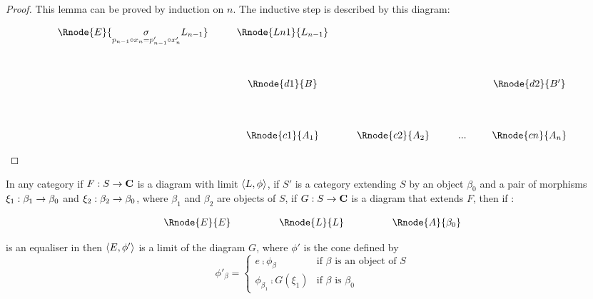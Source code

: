 \documentclass[10pt,a4paper]{scrartcl}
\begin{document}
\begin{proof}
\noindent This lemma can be proved by induction on $n$. 
The inductive step is described by this diagram:

\begin{center}
\begin{displaymath}
\begin{array}{cp{0.3cm}cp{0.3cm}c         p{0.3cm}  c p{0.2cm} c}
\Rnode{E}{\underset{p_{n-1} \comp x_n=p'_{n-1} \comp x'_n}{\sigma}L_{n-1}}&&\Rnode{Ln1}{L_{n-1}}& &               & &     & &                \\ [1.4cm]
&&\Rnode{d1}{B}& &               & &     & &\Rnode{d2}{B'}  \\ [1.4cm]
&&\Rnode{c1}{A_1}& &\Rnode{c2}{A_2}& & ... & &\Rnode{cn}{A_n}
\end{array}
\end{displaymath}
\end{center}

\end{proof}
\iffalse
\begin{lemma}
In any category  if $F: S \rightarrow \textbf{C}$ is a diagram with limit $\langle L,\phi\rangle$,
if $S'$ is a category extending $S$ by an object $\beta_0$ and a pair of morphisms $\xi_1: \beta_1 \rightarrow \beta_0$ and $\xi_2: \beta_2 \rightarrow \beta_0$, where $\beta_1$ and $\beta_2$ are objects of $S$, if $G: S \rightarrow \textbf{C}$ is a diagram that extends $F$, then if :
\begin{center}
\begin{equation}
\label{equaliser}
\begin{array}{cp{1cm}cp{1cm} c}
\Rnode{E}{E}& &    \Rnode{L}{L}  & & \Rnode{A}{\beta_0} 
\end{array}
\end{equation}
\setlength{\arroffsetA}{3pt}
\setlength{\arroffsetB}{3pt}
\setlength{\arroffsetA}{-3pt}
\setlength{\arroffsetB}{-3pt}
\arreset
\end{center}
is an equaliser in  then $\langle E,\phi'\rangle$ is a limit of the diagram $G$, where
$\phi'$ is the cone defined by
\begin{equation*}
\phi'_\beta =
\left\{
	\begin{array}{ll}
		e \comp \phi_\beta           & \mbox{if } \beta \mbox{ is an object of } S  \\
		\phi_{\beta_1} \comp G(\xi_1) & \mbox{if } \beta \mbox{ is } \beta_0 
	\end{array}
\right.
\end{equation*}

\end{lemma}
\end{document}
